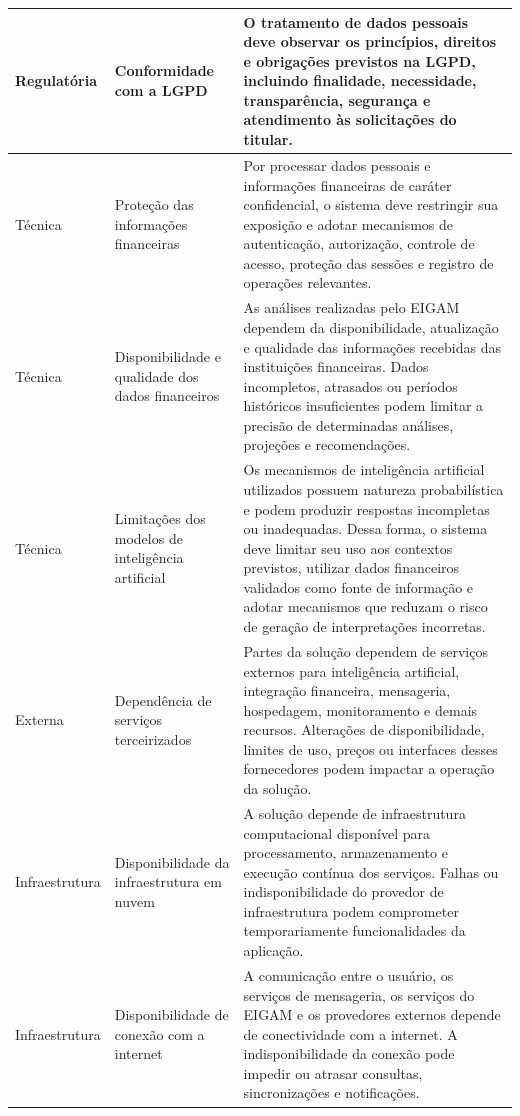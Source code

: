{\begin{longtable}{|L{2.3cm}|L{4.0cm}|L{8.2cm}|}
Regulatória &
Conformidade com a LGPD &
O tratamento de dados pessoais deve observar os princípios, direitos e obrigações previstos na LGPD, incluindo finalidade, necessidade, transparência, segurança e atendimento às solicitações do titular.
\\ \hline

Técnica &
Proteção das informações financeiras &
Por processar dados pessoais e informações financeiras de caráter confidencial, o sistema deve restringir sua exposição e adotar mecanismos de autenticação, autorização, controle de acesso, proteção das sessões e registro de operações relevantes.
\\ \hline

Técnica &
Disponibilidade e qualidade dos dados financeiros &
As análises realizadas pelo EIGAM dependem da disponibilidade, atualização e qualidade das informações recebidas das instituições financeiras. Dados incompletos, atrasados ou períodos históricos insuficientes podem limitar a precisão de determinadas análises, projeções e recomendações.
\\ \hline

Técnica &
Limitações dos modelos de inteligência artificial &
Os mecanismos de inteligência artificial utilizados possuem natureza probabilística e podem produzir respostas incompletas ou inadequadas. Dessa forma, o sistema deve limitar seu uso aos contextos previstos, utilizar dados financeiros validados como fonte de informação e adotar mecanismos que reduzam o risco de geração de interpretações incorretas.
\\ \hline

Externa &
Dependência de serviços terceirizados &
Partes da solução dependem de serviços externos para inteligência artificial, integração financeira, mensageria, hospedagem, monitoramento e demais recursos. Alterações de disponibilidade, limites de uso, preços ou interfaces desses fornecedores podem impactar a operação da solução.
\\ \hline

Infraestrutura &
Disponibilidade da infraestrutura em nuvem &
A solução depende de infraestrutura computacional disponível para processamento, armazenamento e execução contínua dos serviços. Falhas ou indisponibilidade do provedor de infraestrutura podem comprometer temporariamente funcionalidades da aplicação.
\\ \hline

Infraestrutura &
Disponibilidade de conexão com a internet &
A comunicação entre o usuário, os serviços de mensageria, os serviços do EIGAM e os provedores externos depende de conectividade com a internet. A indisponibilidade da conexão pode impedir ou atrasar consultas, sincronizações e notificações.
\\ \hline

\end{longtable}
}

